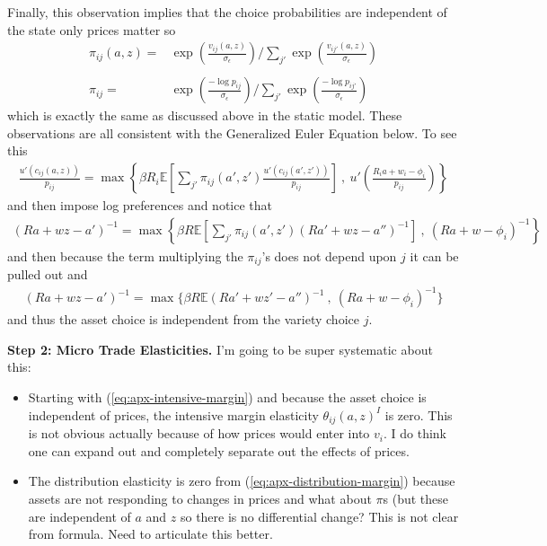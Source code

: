 \documentclass[12pt,pdftex]{article}
\begin{document}
\begin{onehalfspacing}
Finally, this observation implies that the choice probabilities are independent of the state only prices matter so
\begin{align}
\pi_{ij}(a, z) = & \exp \left( \frac{ v_{ij}(a, z) }{\sigma_{\epsilon}} \right) \Bigg / \sum_{j'} \exp \left( \frac{ v_{ij'}(a, z ) }{\sigma_{\epsilon}} \right) \\
\nonumber\\
\pi_{ij} = & \exp \left( \frac{  -\log p_{ij} }{\sigma_{\epsilon}} \right) \Bigg / \sum_{j'} \exp \left( \frac{ -\log p_{ij'} }{\sigma_{\epsilon}} \right)
\end{align}
which is exactly the same as discussed above in the static model. These observations are all consistent with the Generalized Euler Equation below. To see this
\begin{align}
\frac{u'(c_{ij}(a, z))}{p_{ij}} = \max \left\{ \beta R_{i} \mathbb{E} \left[ \sum_{j'} \pi_{ij}(a', z') \frac{u'(c_{ij}(a', z'))}{p_{ij}} \right] \ , \  u' \left( \frac{R_i a + w_i - \phi_{i}}{p_{ij}} \right) \right \}
\end{align}
and then impose log preferences and notice that
\begin{align}
(Ra + wz - a')^{-1} = \max \left\{ \beta R \mathbb{E} \left[ \sum_{j'} \pi_{ij}(a', z') (Ra' + wz - a'')^{-1} \right] \ , \   (R a + w - \phi_{i})^{-1} \right \}
\end{align}
and then because the term multiplying the $\pi_{ij}$'s does not depend upon $j$ it can be pulled out and
\begin{align}
(Ra + wz - a')^{-1} = \max \bigg \{ \beta R \mathbb{E} (Ra' + wz' - a'')^{-1}  \ , \   (R a + w - \phi_{i})^{-1}  \bigg \}
\end{align}
and thus the asset choice is independent from the variety choice $j$. 

\textbf{Step 2: Micro Trade Elasticities.} I'm going to be super systematic about this:
\begin{itemize}
\item Starting with (\ref{eq:apx-intensive-margin}) and because the asset choice is independent of prices,  the intensive margin elasticity $\theta_{ij}(a,z)^I$ is zero. This is not obvious actually because of how prices would enter into $v_{i}$. I do think one can expand out and completely separate out the effects of prices. 

\item The distribution elasticity is zero from (\ref{eq:apx-distribution-margin}) because assets are not responding to changes in prices and what about $\pi$s (but these are independent of $a$ and $z$ so there is no differential change? This is not clear from formula. Need to articulate this better.


\end{itemize}
\end{onehalfspacing}
\end{document}
